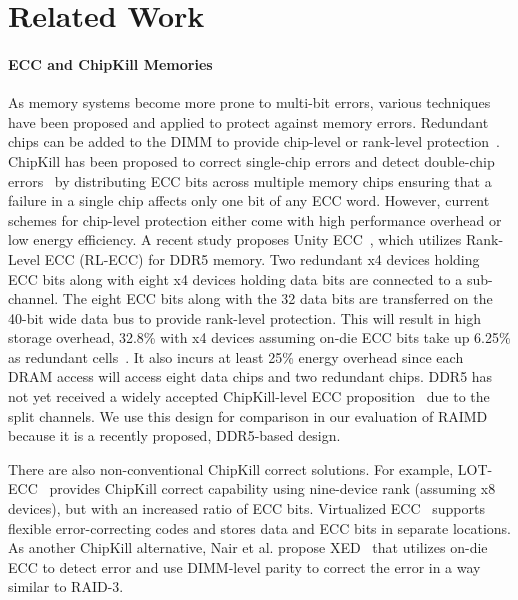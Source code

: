 \documentclass[11pt]{article}
\newcommand{\etal}{et al.\xspace} \newcommand{\naive}{na\"ive\xspace}
\begin{document}

\section{Related Work}

\paragraph{ECC and ChipKill Memories} As memory systems become more prone to
multi-bit errors, various techniques have been proposed and applied to protect
against memory errors.  Redundant chips can be added to the DIMM to provide
chip-level or rank-level
protection~\cite{IBM:whitepaper97,DELL:chipkill00,Intel:note02, ChipKill,
ddr5_fault_bound, unity_ecc}.  ChipKill has been proposed to correct single-chip
errors and detect double-chip errors~\cite{ChipKill} by distributing ECC bits
across multiple memory chips ensuring that a failure in a single chip affects
only one bit of any ECC word.  However, current schemes for chip-level
protection either come with high performance overhead or low energy efficiency.
A recent study proposes Unity ECC~\cite{unity_ecc}, which utilizes Rank-Level
ECC (RL-ECC) for DDR5 memory.  Two redundant x4 devices holding ECC bits along
with eight x4 devices holding data bits are connected to a sub-channel.  The
eight ECC bits along with the 32 data bits are transferred on the 40-bit wide
data bus to provide rank-level protection.  This will result in high storage
overhead, 32.8\% with x4 devices assuming on-die ECC bits take up 6.25\% as
redundant cells~\cite{unity_ecc}.  It also incurs at least 25\% energy overhead
since each DRAM access will access eight data chips and two redundant chips.
DDR5 has not yet received a widely accepted ChipKill-level ECC
proposition~\cite{Row_Hammer_Resilient_DRAM} due to the split channels.  We use
this design for comparison in our evaluation of RAIMD because it is a recently
proposed, DDR5-based design.

There are also non-conventional ChipKill correct solutions.  For example,
LOT-ECC~\cite{Udipi:ISCA12} provides ChipKill correct capability using
nine-device rank (assuming x8 devices), but with an increased ratio of ECC bits.
Virtualized ECC~\cite{Doe:ASPLOS10} supports flexible error-correcting codes and
stores data and ECC bits in separate locations.  As another ChipKill
alternative, Nair \etal propose XED~\cite{Nair:isca2016} that utilizes on-die
ECC to detect error and use DIMM-level parity to correct the error in a way
similar to RAID-3.
\end{document}
